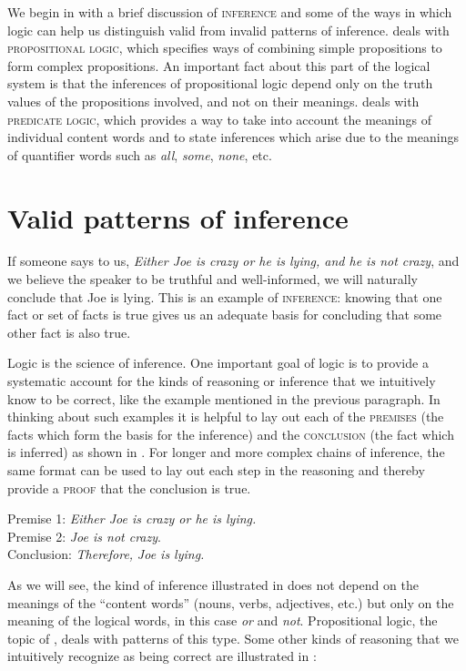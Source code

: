 We begin in  with a brief discussion of \textsc{inference} and some of the ways in which logic can help us distinguish valid from invalid patterns of inference.  deals with \textsc{propositional logic}, which specifies ways of combining simple propositions to form complex propositions. An important fact about this part of the logical system is that the inferences of propositional logic depend only on the truth values of the propositions involved, and not on their meanings.  deals with \textsc{predicate logic}, which provides a way to take into account the meanings of individual content words and to state inferences which arise due to the meanings of quantifier words such as \textit{all}, \textit{some}, \textit{none}, etc.


\section{Valid patterns of inference}\label{sec:} %

If someone says to us, \textit{Either Joe is crazy or he is lying, and he is not crazy}, and we believe the speaker to be truthful and well-informed, we will naturally conclude that Joe is lying. This is an example of \textsc{inference}: knowing that one fact or set of facts is true gives us an adequate basis for concluding that some other fact is also true.



Logic is the science of inference. One important goal of logic is to provide a systematic account for the kinds of reasoning or inference that we intuitively know to be correct, like the example mentioned in the previous paragraph. In thinking about such examples it is helpful to lay out each of the \textsc{premises} (the facts which form the basis for the inference) and the \textsc{conclusion} (the fact which is inferred) as shown in . For longer and more complex chains of inference, the same format can be used to lay out each step in the reasoning and thereby provide a \textsc{proof} that the conclusion is true.


\ea \label{ex:4.1}
Premise 1: \textit{Either Joe is crazy or he is lying.}\\
Premise 2: \textit{Joe is not crazy}.\\
\FelixHRule
Conclusion: \textit{Therefore,} \textit{Joe is lying.}
\z


As we will see, the kind of inference illustrated in  does not depend on the meanings of the “content words” (nouns, verbs, adjectives, etc.) but only on the meaning of the logical words, in this case \textit{or} and \textit{not}. Propositional logic, the topic of , deals with patterns of this type. Some other kinds of reasoning that we intuitively recognize as being correct are illustrated in :


